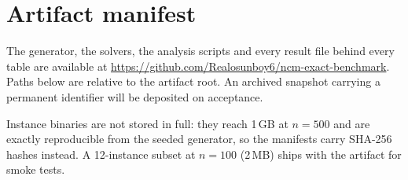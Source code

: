 \section{Artifact manifest}\label{app:artifact}

The generator, the solvers, the analysis scripts and every result file behind
every table are available at
\url{https://github.com/Realosunboy6/ncm-exact-benchmark}. Paths below are
relative to the artifact root. An archived snapshot carrying a permanent
identifier will be deposited on acceptance.

Instance binaries are not stored in full: they reach 1\,GB at $n=500$ and are
exactly reproducible from the seeded generator, so the manifests carry SHA-256
hashes instead. A 12-instance subset at $n=100$ (2\,MB) ships with the artifact
for smoke tests.

